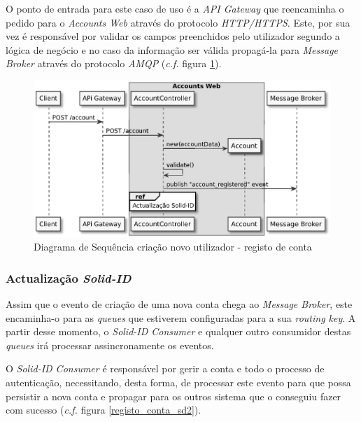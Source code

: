 O ponto de entrada para este caso de uso é a \emph{API Gateway} que reencaminha o pedido para o \emph{Accounts Web} através do protocolo \emph{HTTP/HTTPS}. Este, por sua vez é responsável por validar os campos preenchidos pelo utilizador segundo a lógica de negócio e no caso da informação ser válida propagá-la para \emph{Message Broker} através do protocolo \emph{AMQP} (\emph{c.f.} figura \ref{registo_conta_sd1}).

\begin{figure}[H]
    \begin{center}
    \includegraphics[width=1 \textwidth]{figures/create_account_sd_diagram_1.eps}
    \caption{Diagrama de Sequência criação novo utilizador - registo de conta}
    \label{registo_conta_sd1}
    \end{center}
\end{figure}

\subsubsection{Actualização \emph{Solid-ID}}

Assim que o evento de criação de uma nova conta chega ao \emph{Message Broker}, este encaminha-o para as \emph{queues} que estiverem configuradas para a sua \emph{routing key}. A partir desse momento, o \emph{Solid-ID Consumer} e qualquer outro consumidor  destas \emph{queues} irá processar assincronamente os eventos.

O \emph{Solid-ID Consumer} é responsável por gerir a conta e todo o processo de autenticação, necessitando, desta forma, de processar este evento para que possa persistir a nova conta e propagar para os outros sistema que o conseguiu fazer com sucesso (\emph{c.f.} figura \ref{registo_conta_sd2}).

